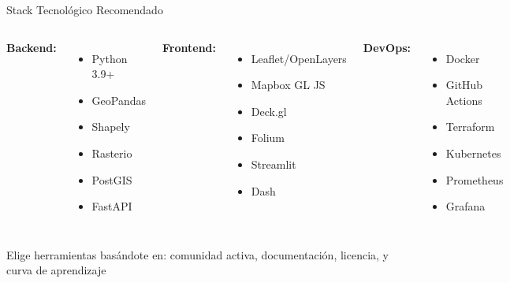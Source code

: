 \documentclass[10pt,aspectratio=169]{beamer}
\newcommand{\conceptbox}[2]{
\begin{tcolorbox}[colframe=usachblue,colback=blue!5,title=#1,fonttitle=\bfseries]
#2
\end{tcolorbox}
}
\begin{document}
\begin{frame}{Stack Tecnológico Recomendado}
    \begin{columns}[T]
        \textbf{Backend:}
        \begin{itemize}
            \item Python 3.9+
            \item GeoPandas
            \item Shapely
            \item Rasterio
            \item PostGIS
            \item FastAPI
        \end{itemize}
        
        \textbf{Frontend:}
        \begin{itemize}
            \item Leaflet/OpenLayers
            \item Mapbox GL JS
            \item Deck.gl
            \item Folium
            \item Streamlit
            \item Dash
        \end{itemize}
        
        \textbf{DevOps:}
        \begin{itemize}
            \item Docker
            \item GitHub Actions
            \item Terraform
            \item Kubernetes
            \item Prometheus
            \item Grafana
        \end{itemize}
    \end{columns}
    
    \vspace{0.5cm}
    \conceptbox{Criterios de Selección}{
        Elige herramientas basándote en: comunidad activa, documentación, licencia, y curva de aprendizaje
    }
\end{frame}
\end{document}
